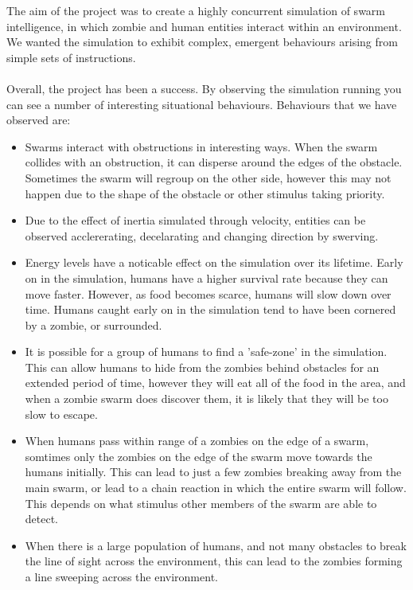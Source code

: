 \documentclass[10pt, a4paper, conference, compsocconf]{IEEEtran}
\begin{document}
The aim of the project was to create a highly concurrent simulation of swarm intelligence, in which zombie and human entities interact within an environment. We wanted the simulation to exhibit complex, emergent behaviours arising from simple sets of instructions.\\
\\
Overall, the project has been a success. By observing the simulation running you can see a number of interesting situational behaviours. Behaviours that we have observed are:
\begin{itemize}
    \item Swarms interact with obstructions in interesting ways. When the swarm collides with an obstruction, it can disperse around the edges of the obstacle. Sometimes the swarm will regroup on the other side, however this may not happen due to the shape of the obstacle or other stimulus taking priority.
    \item Due to the effect of inertia simulated through velocity, entities can be observed acclererating, decelarating and changing direction by swerving. \item Energy levels have a noticable effect on the simulation over its lifetime. Early on in the simulation, humans have a higher survival rate because they can move faster. However, as food becomes scarce, humans will slow down over time. Humans caught early on in the simulation tend to have been cornered by a zombie, or surrounded.
    \item It is possible for a group of humans to find a 'safe-zone' in the simulation. This can allow humans to hide from the zombies behind obstacles  for an extended period of time, however they will eat all of the food in the area, and when a zombie swarm does discover them, it is likely that they will be too slow to escape.
    \item When humans pass within range of a zombies on the edge of a swarm, somtimes only the zombies on the edge of the swarm move towards the humans initially. This can lead to just a few zombies breaking away from the main swarm, or lead to a chain reaction in which the entire swarm will follow. This depends on what stimulus other members of the swarm are able to detect.
    \item When there is a large population of humans, and not many obstacles to break the line of sight across the environment, this can lead to the zombies forming a line sweeping across the environment.
\end{itemize}
\end{document}
